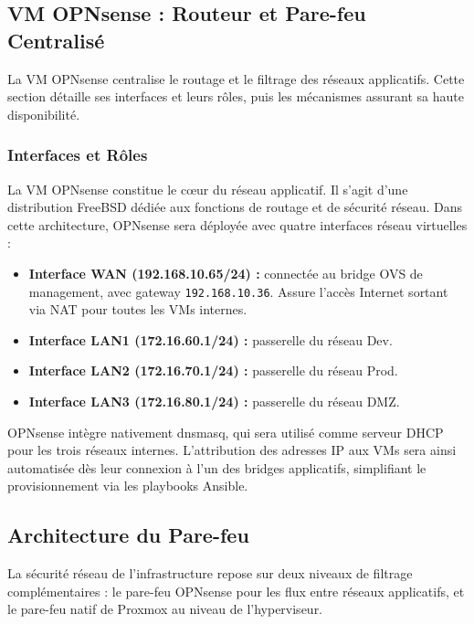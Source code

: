 \subsection{VM OPNsense : Routeur et Pare-feu Centralisé}

\par La VM OPNsense centralise le routage et le filtrage des réseaux applicatifs. Cette section détaille ses interfaces et leurs rôles, puis les mécanismes assurant sa haute disponibilité.\\

\subsubsection{Interfaces et Rôles}

\par La VM OPNsense constitue le cœur du réseau applicatif. Il s'agit d'une distribution FreeBSD dédiée aux fonctions de routage et de sécurité réseau. Dans cette architecture, OPNsense sera déployée avec quatre interfaces réseau virtuelles :\\

\begin{itemize}
    \item \textbf{Interface WAN (192.168.10.65/24) :} connectée au bridge OVS de management, avec gateway \texttt{192.168.10.36}. Assure l'accès Internet sortant via NAT pour toutes les VMs internes.
    \item \textbf{Interface LAN1 (172.16.60.1/24) :} passerelle du réseau Dev.
    \item \textbf{Interface LAN2 (172.16.70.1/24) :} passerelle du réseau Prod.
    \item \textbf{Interface LAN3 (172.16.80.1/24) :} passerelle du réseau DMZ.
\end{itemize}

\par OPNsense intègre nativement dnsmasq, qui sera utilisé comme serveur DHCP pour les trois réseaux internes. L'attribution des adresses IP aux VMs sera ainsi automatisée dès leur connexion à l'un des bridges applicatifs, simplifiant le provisionnement via les playbooks Ansible.\\

\subsection{Architecture du Pare-feu}

\par La sécurité réseau de l'infrastructure repose sur deux niveaux de filtrage complémentaires : le pare-feu OPNsense pour les flux entre réseaux applicatifs, et le pare-feu natif de Proxmox au niveau de l'hyperviseur.\\

